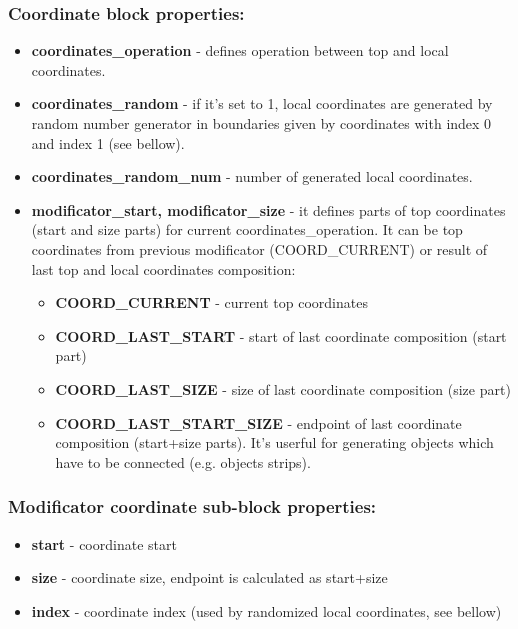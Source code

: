 \documentclass[9pt]{article}
\begin{document}
\subsubsection*{Coordinate block properties:}
\begin{itemize}
\item{\bf coordinates\_operation} - defines operation between top and local coordinates.
\item{\bf coordinates\_random} - if it's set to 1, local coordinates are generated by random number
generator in boundaries given by coordinates with index 0 and index 1 (see bellow).
\item{\bf coordinates\_random\_num} - number of generated local coordinates.    
\item{\bf modificator\_start, modificator\_size} - it defines parts of top 
coordinates (start and size parts) for current coordinates\_operation. 
It can be top coordinates from previous modificator (COORD\_CURRENT) or 
result of last top and local coordinates composition:
\begin{itemize}
\item{\bf COORD\_CURRENT} - current top coordinates
\item{\bf COORD\_LAST\_START} - start of last coordinate composition (start part)
\item{\bf COORD\_LAST\_SIZE} - size of last coordinate composition (size part)
\item{\bf COORD\_LAST\_START\_SIZE} - endpoint of last coordinate composition (start+size parts).
It's userful for generating objects which have to be connected (e.g. objects strips).
\end{itemize}
\end{itemize}
\subsubsection*{Modificator coordinate sub-block properties:}
\begin{itemize}
\item{\bf start} - coordinate start
\item{\bf size} - coordinate size, endpoint is calculated as start+size
\item{\bf index} - coordinate index (used by randomized local coordinates, see bellow)
\end{itemize}
\end{document}
